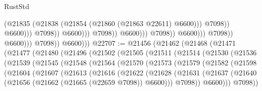 \begin{lexlean}{RustStd}
\begin{coremodule}
                                                              (@21835
                                                                (@21838
                                                                  (@21854
                                                                    (@21860 (@21863 @22611) @6600)))
                                                                @7098))
                                                            @6600)))
                                                      @7098))
                                                  @6600)))
                                            @7098))
                                        @6600)))
                                  @7098))
                              @6600)))
                        @7098))
                    @6600)))
              @7098))
          @6600)))
@22707 := @21456
    (@21462
      (@21468
        (@21471
          (@21477
            (@21480
              (@21496
                (@21502
                  (@21505
                    (@21511
                      (@21514
                        (@21530
                          (@21536
                            (@21539
                              (@21545
                                (@21548
                                  (@21564
                                    (@21570
                                      (@21573
                                        (@21579
                                          (@21582
                                            (@21598
                                              (@21604
                                                (@21607
                                                  (@21613
                                                    (@21616
                                                      (@21622
                                                        (@21628
                                                          (@21631
                                                            (@21637
                                                              (@21640
                                                                (@21656
                                                                  (@21662
                                                                    (@21665 (@22659 @7098))
                                                                    @6600)))
                                                              @7098))
                                                          @6600)))
                                                    @7098))

\end{coremodule}
\end{lexlean}
